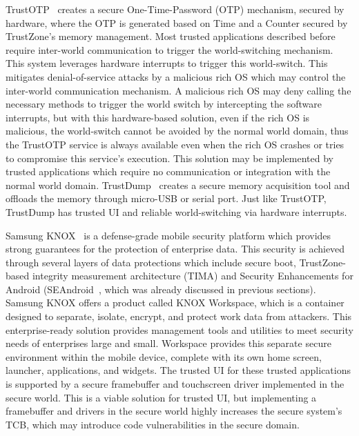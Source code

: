 TrustOTP~\cite{sun2015trustotp} creates a secure One-Time-Password (OTP) mechanism, secured by hardware, where the OTP is generated based on Time and a Counter secured by TrustZone's memory management. Most trusted applications described before require inter-world communication to trigger the world-switching mechanism. This system leverages hardware interrupts to trigger this world-switch. This mitigates denial-of-service attacks by a malicious rich OS which may control the inter-world communication mechanism. A malicious rich OS may deny calling the necessary methods to trigger the world switch by intercepting the software interrupts, but with this hardware-based solution, even if the rich OS is malicious, the world-switch cannot be avoided by the normal world domain, thus the TrustOTP service is always available even when the rich OS crashes or tries to compromise this service's execution. This solution may be implemented by trusted applications which require no communication or integration with the normal world domain. TrustDump~\cite{sun2015reliable} creates a secure memory acquisition tool and offloads the memory through micro-USB or serial port. Just like TrustOTP, TrustDump has trusted UI and reliable world-switching via hardware interrupts.

Samsung KNOX~\cite{knox_whitepaper} is a defense-grade mobile security platform which provides strong guarantees for the protection of enterprise data. This security is achieved through several layers of data protections which include secure boot, TrustZone-based integrity measurement architecture (TIMA) and Security Enhancements for Android (SEAndroid~\cite{smalley2013security}, which was already discussed in previous sections). Samsung KNOX offers a product called KNOX Workspace, which is a container designed to separate, isolate, encrypt, and protect work data from attackers. This enterprise-ready solution provides management tools and utilities to meet security needs of enterprises large and small. Workspace provides this separate secure environment within the mobile device, complete with its own home screen, launcher, applications, and widgets. %
The trusted UI for these trusted applications is supported by a secure framebuffer and touchscreen driver implemented in the secure world. This is a viable solution for trusted UI, but implementing a framebuffer and drivers in the secure world highly increases the secure system's TCB, which may introduce code vulnerabilities in the secure domain.

